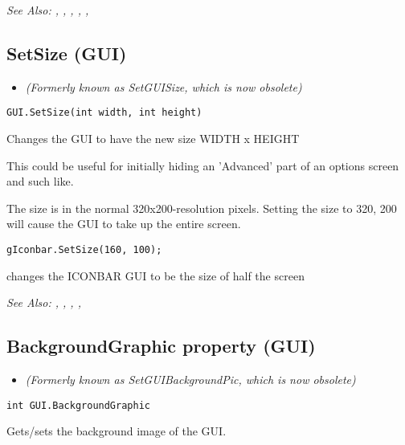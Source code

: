 \it{See Also:} , ,
, ,
, 



\subsection{SetSize (GUI)}\label{GUI.SetSize}%

\begin{itemize}
\item \it{(Formerly known as SetGUISize, which is now obsolete)}
\end{itemize}

\begin{verbatim}
GUI.SetSize(int width, int height)
\end{verbatim}
Changes the GUI to have the new size  WIDTH x HEIGHT

This could be useful for initially hiding an 'Advanced' part of an options screen
and such like.

The size is in the normal 320x200-resolution pixels. Setting the size to 320, 200 will
cause the GUI to take up the entire screen.

\begin{verbatim}
gIconbar.SetSize(160, 100);
\end{verbatim}
changes the ICONBAR GUI to be the size of half the screen

\it{See Also:} ,
,
,
,



\subsection{BackgroundGraphic property (GUI)}\label{GUI.BackgroundGraphic}%

\begin{itemize}
\item \it{(Formerly known as SetGUIBackgroundPic, which is now obsolete)}
\end{itemize}

\begin{verbatim}
int GUI.BackgroundGraphic
\end{verbatim}
Gets/sets the background image of the GUI.

